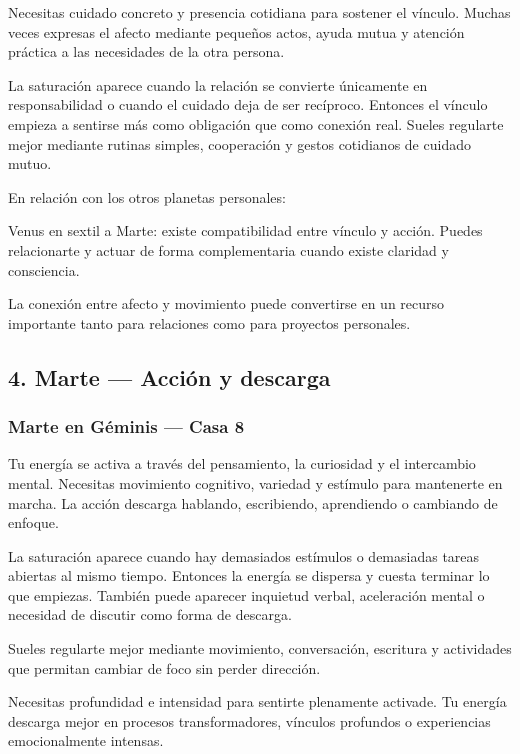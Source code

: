 \documentclass[11pt,a4paper]{article}
\begin{document}
Necesitas cuidado concreto y presencia cotidiana para sostener el vínculo. Muchas veces expresas el afecto mediante pequeños actos, ayuda mutua y atención práctica a las necesidades de la otra persona.

La saturación aparece cuando la relación se convierte únicamente en responsabilidad o cuando el cuidado deja de ser recíproco. Entonces el vínculo empieza a sentirse más como obligación que como conexión real. Sueles regularte mejor mediante rutinas simples, cooperación y gestos cotidianos de cuidado mutuo.

En relación con los otros planetas personales:

Venus en sextil a Marte: existe compatibilidad entre vínculo y acción. Puedes relacionarte y actuar de forma complementaria cuando existe claridad y consciencia.

La conexión entre afecto y movimiento puede convertirse en un recurso importante tanto para relaciones como para proyectos personales.

\vspace{0.8cm}

\subsection{4. Marte — Acción y descarga}

\subsubsection*{Marte en Géminis — Casa 8}

\justifying
Tu energía se activa a través del pensamiento, la curiosidad y el intercambio mental. Necesitas movimiento cognitivo, variedad y estímulo para mantenerte en marcha. La acción descarga hablando, escribiendo, aprendiendo o cambiando de enfoque.

La saturación aparece cuando hay demasiados estímulos o demasiadas tareas abiertas al mismo tiempo. Entonces la energía se dispersa y cuesta terminar lo que empiezas. También puede aparecer inquietud verbal, aceleración mental o necesidad de discutir como forma de descarga.

Sueles regularte mejor mediante movimiento, conversación, escritura y actividades que permitan cambiar de foco sin perder dirección.

Necesitas profundidad e intensidad para sentirte plenamente activade. Tu energía descarga mejor en procesos transformadores, vínculos profundos o experiencias emocionalmente intensas.
\end{document}
